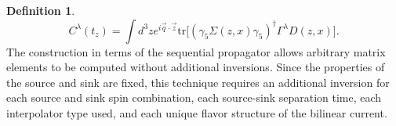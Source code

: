 \documentclass[prd,12pt,superscriptaddress,tightenlines,nofootinbib]{revtex4}
\DeclareMathOperator{\tr}{tr}
\def\mc#1{{\mathcal #1}}
\def\a{{\alpha}}
\def\b{{\beta}}
\def\g{{\gamma}}
\def\G{{\Gamma}}
\def\l{{\lambda}}
\def\ip{{i^\prime}}
\def\jp{{j^\prime}}
\def\kp{{k^\prime}}
\def\ap{{\alpha^\prime}}
\def\bp{{\beta^\prime}}
\def\gp{{\gamma^\prime}}
\def\rp{{\rho^\prime}}
\def\tr{\text{tr}}
\theoremstyle{plain}
\theoremstyle{definition}
\newtheorem{defn}[thm]{Definition}
\theoremstyle{remark}
\def\eqref#1{{(\ref{#1})}}
\begin{document}
\begin{defn}
\begin{equation}
C^\l (t_z) = \int d^3 z  e^{i \vec{q} \cdot \vec{z}} \tr\Big[ \left( \gamma_{5} \Sigma(z,x) \gamma_{5}\right)^{\dagger} \G^\l D(z,x) \Big].
\end{equation}
The construction in terms of the sequential propagator allows arbitrary matrix elements to be computed without additional inversions. Since the properties of the source and sink are fixed, this technique requires an additional inversion for each source and sink spin combination, each source-sink separation time, each interpolator type used, and each unique flavor structure of the bilinear current. 





%
%
%

\end{defn}
\end{document}
